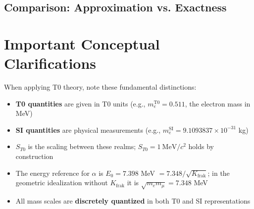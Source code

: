 	\subsection{Comparison: Approximation vs. Exactness}
	
	\begin{table}[h]
		\centering
		\caption{Comparison of geometric idealization in T0 units and physical exactness with fractal correction.}
		\label{tab:approximation-exaktheit}
	\end{table}
	
	\section{Important Conceptual Clarifications}
	
	When applying T0 theory, note these fundamental distinctions:
	
	\begin{itemize}
		\item \textbf{T0 quantities} are given in T0 units (e.g., $m_e^{\mathrm{T0}} = 0.511$, the electron mass in MeV)
		\item \textbf{SI quantities} are physical measurements (e.g., $m_e^{\mathrm{SI}} = 9.1093837\times 10^{-31}$ kg)
		\item \textbf{$S_{T0}$} is the scaling between these realms; $S_{T0} = 1~\mathrm{MeV}/c^2$ holds by construction
		\item The energy reference for $\alpha$ is $E_0 = 7.398$ MeV $= 7.348/\sqrt{K_{\text{frak}}}$; in the geometric idealization without $K_{\text{frak}}$ it is $\sqrt{m_e m_\mu} = 7.348$ MeV
		\item All mass scales are \textbf{discretely quantized} in both T0 and SI representations
	\end{itemize}
	
